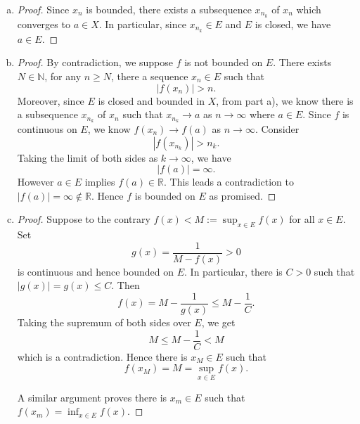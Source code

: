 \begin{Exercise}
\begin{enumerate}[a)]
\item 
\begin{proof}
Since $x_n$ is bounded, there exists a subsequence $x_{n_k}$ of $x_n$ which converges to $a\in X$. In particular, since $x_{n_k}\in E$ and $E$ is closed, we have $a\in E$.
\end{proof}

\item
\begin{proof}
By contradiction, we suppose $f$ is not bounded on $E$. There exists $N\in\mathbb{N}$, for any $n\geq N$, there a sequence $x_n \in E$ such that
$$|f(x_n)| > n.$$
Moreover, since $E$ is closed and bounded in $X$, from part a), we know there is a subsequence $x_{n_k}$ of $x_n$ such that $x_{n_k}\to a$ as $n\to\infty$ where $a\in E$. Since $f$ is continuous on $E$, we know $f(x_n)\to f(a)$ as $n\to\infty$. Consider
$$
\left| f(x_{n_k}) \right| > n_k.
$$
Taking the limit of both sides as $k\to\infty$, we have
$$
\left| f(a) \right| = \infty.
$$
However $a\in E$ implies $f(a)\in\mathbb{R}$. This leads a contradiction to $|f(a)| = \infty \notin \mathbb{R}$. Hence $f$ is bounded on $E$ as promised.
\end{proof}

\item
\begin{proof}
Suppose to the contrary $f(x) < M := \sup_{x\in E}f(x)$ for all $x\in E$. Set
$$
g(x) = \frac{1}{M-f(x)} > 0
$$
is continuous and hence bounded on $E$. In particular, there is $C>0$ such that $|g(x)| = g(x) \leq C$. Then
$$
f(x) = M-\frac{1}{g(x)} \leq M-\frac{1}{C}.
$$
Taking the supremum of both sides over $E$, we get
$$
M\leq M-\frac{1}{C} < M
$$
which is a contradiction. Hence there is $x_M\in E$ such that 
$$
f(x_M) = M = \sup_{x\in E}f(x).
$$

A similar argument proves there is $x_m\in E$ such that $f(x_m) = \inf_{x\in E}f(x)$.
\end{proof}
\end{enumerate}
\end{Exercise}